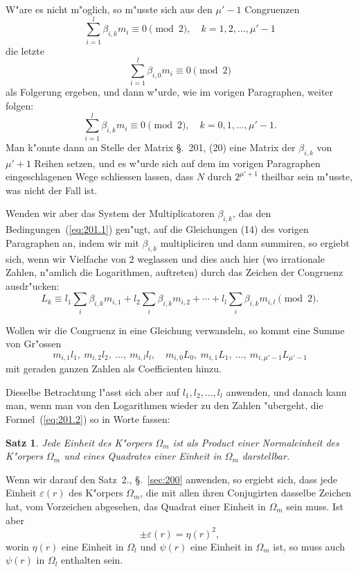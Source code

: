 \documentclass[10pt,a4paper]{article}
\theoremstyle{weberstyle}
\newtheorem{satz}{Satz}[section]
\begin{document}
W"are es nicht m"oglich, so m"usste sich aus den $\mu'-1$ Congruenzen
\[
\sum_{i=1}^{l}\beta_{i,k}m_i \equiv 0\pmod{2},\quad k=1,2,\dots,\mu'-1
\]
die letzte
\[
\sum_{i=1}^{l}\beta_{i,0}m_i \equiv 0\pmod{2}
\]
als Folgerung ergeben, und dann w"urde, wie im vorigen Paragraphen, weiter
folgen:
\[
\sum_{i=1}^{l}\beta_{i,k}m_i \equiv 0\pmod{2},\quad k=0,1,\dots,\mu'-1.
\]
Man k"onnte dann an Stelle der Matrix \S.~201, (20) eine Matrix der
$\beta_{i,k}$ von $\mu'+1$ Reihen setzen, und es w"urde sich auf dem im
vorigen Paragraphen eingeschlagenen Wege schliessen lassen, dass $N$ durch
$2^{\mu'+1}$ theilbar sein m"usste, was nicht der Fall ist.

Wenden wir aber das System der Multiplicatoren $\beta_{i,k}$, das den
Bedingungen~(\ref{eq:201.1}) gen"ugt, auf die Gleichungen (14) des vorigen
Paragraphen an, indem wir mit $\beta_{i,k}$ multipliciren und dann summiren,
so ergiebt sich, wenn wir Vielfache von $2$ weglassen und dies auch hier (wo
irrationale Zahlen, n"amlich die Logarithmen, auftreten) durch das Zeichen
der Congruenz ausdr"ucken:
\begin{equation}\label{eq:201.2}
L_k \equiv l_1\sum_i\beta_{i,k}m_{i,1} + l_2\sum_i\beta_{i,k}m_{i,2} +
\cdots + l_l\sum_i\beta_{i,k}m_{i,l}\pmod{2}.
\end{equation}

Wollen wir die Congruenz in eine Gleichung verwandeln, so kommt eine Summe
von Gr"ossen
\[
m_{i,1}l_1,\ m_{i,2}l_2,\ \dots,\ m_{i,l}l_l,\quad m_{i,0}L_0,\
m_{i,1}L_1,\ \dots,\ m_{i,\mu'-1}L_{\mu'-1}
\]
mit geraden ganzen Zahlen als Coefficienten hinzu.

Dieselbe Betrachtung l"asst sich aber auf $l_1,l_2,\dots,l_l$ anwenden, und
danach kann man, wenn man von den Logarithmen wieder zu den Zahlen
"ubergeht, die Formel~(\ref{eq:201.2}) so in Worte fassen:

\begin{satz}
Jede Einheit des K"orpers $\Omega_m$ ist als Product einer Normaleinheit
des K"orpers $\Omega_m$ und eines Quadrates einer Einheit in $\Omega_m$
darstellbar.
\end{satz}

Wenn wir darauf den Satz~2., \S.~\ref{sec:200} anwenden, so ergiebt sich,
dass jede Einheit $\varepsilon(r)$ des K"orpers $\Omega_m$, die mit allen ihren
Conjugirten dasselbe Zeichen hat, vom Vorzeichen abgesehen, das Quadrat
einer Einheit in $\Omega_m$ sein muss. Ist aber
\[
\pm\varepsilon(r) = \eta(r)^2,
\]
worin $\eta(r)$ eine Einheit in $\Omega_l$ und $\psi(r)$ eine Einheit in
$\Omega_m$ ist, so muss auch $\psi(r)$ in $\Omega_l$ enthalten sein.
\end{document}
